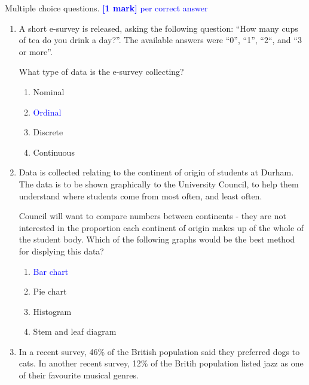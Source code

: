 \documentclass[11pt,a4paper]{article}
\begin{document}
\begin{question}
Multiple choice questions. \textcolor{blue}{\textbf{[1 mark]} per correct answer}
\begin{enumerate}
\item A short e-survey is released, asking the following question: ``How many cups of tea do you drink a day?''. The available answers were ``0'', ``1'', ``2``, and ``3 or more''.

What type of data is the e-survey collecting?

\begin{enumerate}
\item Nominal
\item \textcolor{blue}{Ordinal}
\item Discrete
\item Continuous
\end{enumerate}




\item Data is collected relating to the continent of origin of students at Durham. The data is to be shown graphically to the University Council, to help them understand where students come from most often, and least often.

Council will want to compare numbers between continents - they are not interested in the proportion each continent of origin makes up of the whole of the student body. Which of the following graphs would be the best method for displying this data?

\begin{enumerate}
\item \textcolor{blue}{Bar chart}
\item Pie chart
\item Histogram
\item Stem and leaf diagram
\end{enumerate}



\item In a recent survey, 46\% of the British population said they preferred dogs to cats. In another recent survey, 12\% of the Britih population listed jazz as one of their favourite musical genres.


\end{enumerate}
\end{question}
\end{document}
